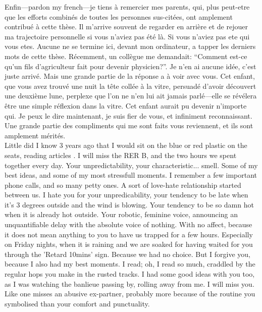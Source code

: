 Enfin---pardon my french---je tiens \`{a} remercier mes parents, qui, plus
peut-etre que les efforts combin\'es de toutes les personnes sus-cit\'ees, ont
amplement contribu\'e à cette th\`ese. Il m'arrive souvent de regarder en
arrière et de rejouer ma trajectoire personnelle si vous n'aviez pas \'et\'e
l\`a. Si vous n'aviez pas ete qui vous etes. Aucune ne se termine ici, devant
mon ordinateur, a tapper les derniers mots de cette th\`ese.  Récemment, un
collègue me demandait: ``Comment est-ce qu'un fils d'agriculteur fait pour
devenir physicien?''. Je n'en ai aucune idée, c'est juste arrivé. Mais une
grande partie de la réponse a à voir avec vous. Cet enfant, que vous avez trouvé
une nuit la t\^ete coll\'ee \`a la vitre, persuad\'e d'avoir d\'ecouvert une
deuxi\`eme lune, perplexe que l'on ne n'en lui ait jamais parl\'e---elle se
r\'ev\'elera \^etre une simple r\'eflexion dans la vitre. Cet enfant aurait pu
devenir n'importe qui. Je peux le dire maintenant, je suis fier de vous, et
infiniment reconnaissant. Une grande partie des compliments qui me sont faits
vous reviennent, et ils sont amplement mérités.\\


Little did I know 3 years ago that I would sit on the blue or red plastic on the
seats, reading articles . I will miss the RER B, and the two hours we spent
together every day. Your unpredictability, your characteristic... smell. Some of
my best ideas, and some of my most stressfull moments. I remember a few
important phone calls, and so many petty ones. A sort of love-hate relationship
started between us. I hate you for your unpredicability, your tendency to be
late when it's 3 degrees outside and the wind is blowing. Your tendency to be so
damn hot when it is already hot outside. Your robotic, feminine voice,
announcing an unquantifiable delay with the absolute voice of nothing. With no
affect, because it does not mean anything to you to have us trapped for a few
hours. Especially on Friday nights, when it is raining and we are soaked for
having waited for you through the 'Retard 10mins' sign. Because we had no
choice. But I forgive you, because I also had my best moments. I read; oh, I
read so much, craddled by the regular hops you make in the rusted tracks. I had
some good ideas with you too, as I was watching the banlieue passing by, rolling
away from me. I will miss you. Like one misses an abusive ex-partner, probably
more because of the routine you symbolised than your comfort and punctuality.\\

